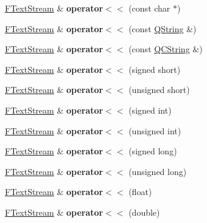 \begin{DoxyCompactItemize}
\item 
\mbox{\label{class_f_text_stream_a930047bc97078e2c98a786fe5c244c77}} 
\mbox{\hyperlink{class_f_text_stream}{F\+Text\+Stream}} \& {\bfseries operator$<$$<$} (const char $\ast$)
\item 
\mbox{\label{class_f_text_stream_a3468149d96ec2ed0918cd8aa7ced0ab3}} 
\mbox{\hyperlink{class_f_text_stream}{F\+Text\+Stream}} \& {\bfseries operator$<$$<$} (const \mbox{\hyperlink{class_q_string}{Q\+String}} \&)
\item 
\mbox{\label{class_f_text_stream_af06c3d6273c5c593220a0078823f946c}} 
\mbox{\hyperlink{class_f_text_stream}{F\+Text\+Stream}} \& {\bfseries operator$<$$<$} (const \mbox{\hyperlink{class_q_c_string}{Q\+C\+String}} \&)
\item 
\mbox{\label{class_f_text_stream_a2a8f83186d0dcb7cf994eda59d8bbab2}} 
\mbox{\hyperlink{class_f_text_stream}{F\+Text\+Stream}} \& {\bfseries operator$<$$<$} (signed short)
\item 
\mbox{\label{class_f_text_stream_a2483704185aab1fdcf304a70623e7f58}} 
\mbox{\hyperlink{class_f_text_stream}{F\+Text\+Stream}} \& {\bfseries operator$<$$<$} (unsigned short)
\item 
\mbox{\label{class_f_text_stream_ab388dd16842bbd8fec91487a15c29959}} 
\mbox{\hyperlink{class_f_text_stream}{F\+Text\+Stream}} \& {\bfseries operator$<$$<$} (signed int)
\item 
\mbox{\label{class_f_text_stream_a64956cc813b4f5bbc317615d0965672a}} 
\mbox{\hyperlink{class_f_text_stream}{F\+Text\+Stream}} \& {\bfseries operator$<$$<$} (unsigned int)
\item 
\mbox{\label{class_f_text_stream_ae8876943f5020db14ffdd11231998ea6}} 
\mbox{\hyperlink{class_f_text_stream}{F\+Text\+Stream}} \& {\bfseries operator$<$$<$} (signed long)
\item 
\mbox{\label{class_f_text_stream_a21fedd3e73094c26f818ca5a1f187666}} 
\mbox{\hyperlink{class_f_text_stream}{F\+Text\+Stream}} \& {\bfseries operator$<$$<$} (unsigned long)
\item 
\mbox{\label{class_f_text_stream_a6c4c40d944c49b1110a8dedc2b1a265e}} 
\mbox{\hyperlink{class_f_text_stream}{F\+Text\+Stream}} \& {\bfseries operator$<$$<$} (float)
\item 
\mbox{\label{class_f_text_stream_af1dd4f6a0044885898df476168e92a7f}} 
\mbox{\hyperlink{class_f_text_stream}{F\+Text\+Stream}} \& {\bfseries operator$<$$<$} (double)
\end{DoxyCompactItemize}


